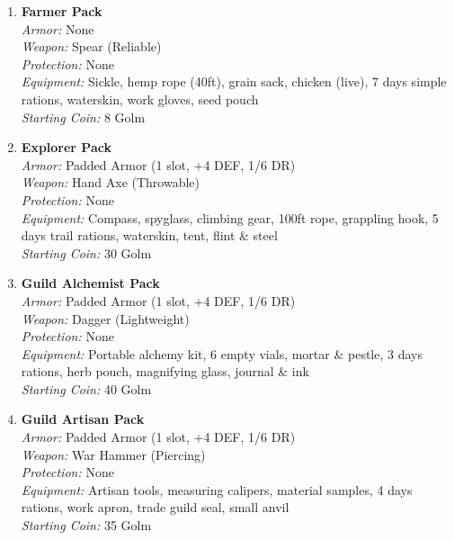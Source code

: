 \documentclass[10pt,twoside]{article}
\begin{document}
\begin{multicols}{2}
\begin{enumerate}
    \item \textcolor{packcolor}{\textbf{Farmer Pack}} \\
    \textit{Armor:} None \\
    \textit{Weapon:} Spear (Reliable) \\
    \textit{Protection:} None \\
    \textit{Equipment:} Sickle, hemp rope (40ft), grain sack, chicken (live), 7 days simple rations, waterskin, work gloves, seed pouch \\
    \textit{Starting Coin:} 8 Golm
    
    \item \textcolor{packcolor}{\textbf{Explorer Pack}} \\
    \textit{Armor:} Padded Armor (1 slot, +4 DEF, 1/6 DR) \\
    \textit{Weapon:} Hand Axe (Throwable) \\
    \textit{Protection:} None \\
    \textit{Equipment:} Compass, spyglass, climbing gear, 100ft rope, grappling hook, 5 days trail rations, waterskin, tent, flint \& steel \\
    \textit{Starting Coin:} 30 Golm
    
    \columnbreak
    
    \item \textcolor{packcolor}{\textbf{Guild Alchemist Pack}} \\
    \textit{Armor:} Padded Armor (1 slot, +4 DEF, 1/6 DR) \\
    \textit{Weapon:} Dagger (Lightweight) \\
    \textit{Protection:} None \\
    \textit{Equipment:} Portable alchemy kit, 6 empty vials, mortar \& pestle, 3 days rations, herb pouch, magnifying glass, journal \& ink \\
    \textit{Starting Coin:} 40 Golm
    
    \item \textcolor{packcolor}{\textbf{Guild Artisan Pack}} \\
    \textit{Armor:} Padded Armor (1 slot, +4 DEF, 1/6 DR) \\
    \textit{Weapon:} War Hammer (Piercing) \\
    \textit{Protection:} None \\
    \textit{Equipment:} Artisan tools, measuring calipers, material samples, 4 days rations, work apron, trade guild seal, small anvil \\
    \textit{Starting Coin:} 35 Golm
    

\end{enumerate}
\end{multicols}
\end{document}
